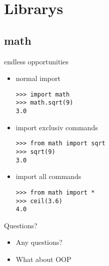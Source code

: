 \documentclass[hyperref={pdfpagelabels=false}]{beamer}
\begin{document}
\section{Librarys}
    \subsection{math}
		\begin{frame}[fragile]{endless opportunities}
			\begin{itemize}
                \item<1-> normal import
                \begin{lstlisting}
>>> import math
>>> math.sqrt(9)
3.0
\end{lstlisting}
                \item<2-> import exclusiv commands
                \begin{lstlisting}
>>> from math import sqrt
>>> sqrt(9)
3.0
\end{lstlisting}
                \item<3-> import all commands
                \begin{lstlisting}
>>> from math import *
>>> ceil(3.6)
4.0
\end{lstlisting}
            \end{itemize}
		\end{frame}
        \begin{frame}{Questions?}
			\begin{itemize}
                \item<1-> Any questions?
                \item<2-> What about OOP
            \end{itemize}
		\end{frame}
        
        
\end{document}
